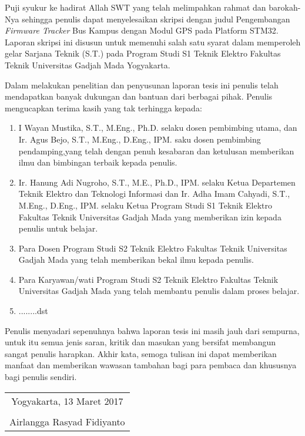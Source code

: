 Puji syukur ke hadirat Allah SWT yang telah melimpahkan rahmat dan barokah-Nya sehingga penulis dapat menyelesaikan skripsi dengan judul Pengembangan \textit{Firmware Tracker} Bus Kampus dengan Modul GPS pada Platform STM32. Laporan skripsi ini disusun untuk memenuhi salah satu syarat dalam memperoleh gelar Sarjana Teknik (S.T.) pada Program Studi S1 Teknik Elektro Fakultas Teknik Universitas Gadjah Mada Yogyakarta.


Dalam melakukan penelitian dan penyusunan laporan tesis ini penulis telah mendapatkan banyak dukungan dan bantuan dari berbagai pihak. Penulis mengucapkan terima kasih yang tak terhingga kepada:

\begin{enumerate}
	\item I Wayan Mustika, S.T., M.Eng., Ph.D. selaku dosen pembimbing utama, dan Ir. Agus Bejo, S.T., M.Eng., D.Eng., IPM. saku dosen pembimbing pendamping,yang telah dengan penuh kesabaran dan ketulusan memberikan ilmu dan bimbingan terbaik kepada penulis.
	
	\item Ir. Hanung Adi Nugroho, S.T., M.E., Ph.D., IPM. selaku Ketua Departemen Teknik Elektro dan Teknologi Informasi dan Ir. Adha Imam Cahyadi, S.T., M.Eng., D.Eng., IPM. selaku Ketua Program Studi S1 Teknik Elektro Fakultas Teknik Universitas Gadjah Mada yang memberikan izin kepada penulis untuk belajar.
	
	\item Para Dosen Program Studi S2 Teknik Elektro Fakultas Teknik Universitas Gadjah Mada yang telah memberikan bekal ilmu kepada penulis.
	
	\item Para Karyawan/wati Program Studi S2 Teknik Elektro Fakultas Teknik Universitas Gadjah Mada yang telah membantu penulis dalam proses belajar.
	
	\item ........dst

\end{enumerate}

Penulis menyadari sepenuhnya bahwa laporan tesis ini masih jauh dari sempurna, untuk itu semua jenis saran, kritik dan masukan yang bersifat membangun sangat penulis harapkan. Akhir kata, semoga tulisan ini dapat memberikan manfaat dan memberikan wawasan tambahan bagi para pembaca dan khususnya bagi penulis sendiri.

\begin{flushright}
	\begin{tabular}{c}
		Yogyakarta, 13 Maret 2017 \\
		\vspace{1cm} \\
		Airlangga Rasyad Fidiyanto
	\end{tabular}
\end{flushright}